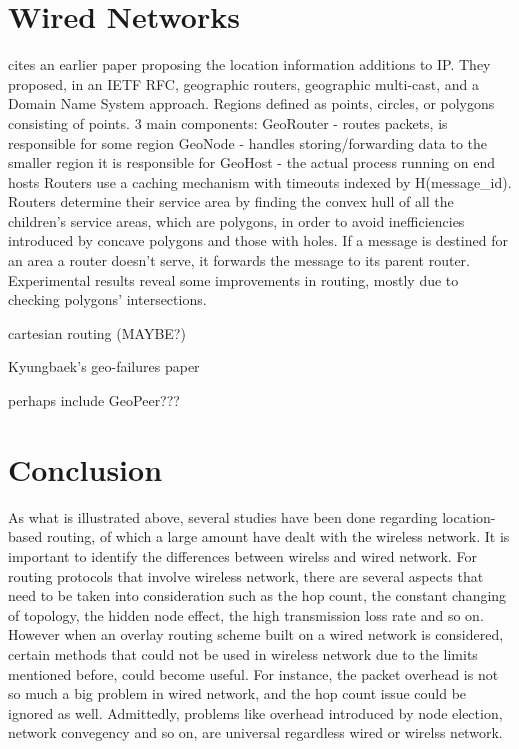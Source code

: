 \documentclass[conference]{IEEEtran}
\begin{document}

\section{Wired Networks}

\cite{Navas1997} cites an earlier paper proposing the location information additions to IP.
They proposed, in an IETF RFC, geographic routers, geographic multi-cast, and a Domain Name System approach.
Regions defined as points, circles, or polygons consisting of points.
3 main components:
GeoRouter - routes packets, is responsible for some region
GeoNode - handles storing/forwarding data to the smaller region it is responsible for
GeoHost - the actual process running on end hosts 
Routers use a caching mechanism with timeouts indexed by H(message_id).
Routers determine their service area by finding the convex hull of all the children's service areas, which are polygons, in order to avoid inefficiencies introduced by concave polygons and those with holes.
If a message is destined for an area a router doesn't serve, it forwards the message to its parent router. 
Experimental results reveal some improvements in routing, mostly due to checking polygons' intersections.

\cite{Finn1987} cartesian routing (MAYBE?)

\cite{Kim2010} Kyungbaek's geo-failures paper

perhaps include GeoPeer???


\section{Conclusion}
\label{conclusion}
As what is illustrated above, several studies have been done regarding location-based routing, of which a large amount have dealt with the wireless network. It is important to identify the differences between wirelss and wired network. For routing protocols that involve wireless network, there are several aspects that need to be taken into consideration
such as the hop count, the constant changing of topology, the hidden node effect, the high transmission loss rate and so on. However when an overlay routing scheme built on a wired network is considered, certain methods that could not be used in wireless network due to the limits mentioned before, could become useful. For instance, the packet overhead is
not so much a big problem in wired network, and the hop count issue could be ignored as well. Admittedly, problems like overhead introduced by node election, network convegency and so on, are universal regardless wired or wirelss network.
\end{document}
